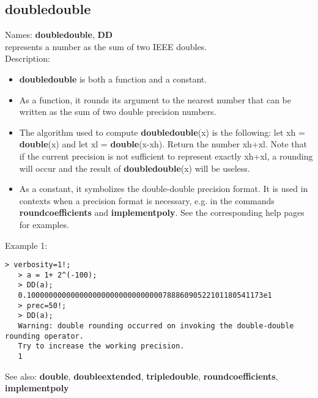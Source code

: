 \subsection{ doubledouble }
\noindent Names: \textbf{doubledouble}, \textbf{DD}\\
represents a number as the sum of two IEEE doubles.\\

\noindent Description: \begin{itemize}

\item \textbf{doubledouble} is both a function and a constant.

\item As a function, it rounds its argument to the nearest number that can be written
   as the sum of two double precision numbers.

\item The algorithm used to compute \textbf{doubledouble}(x) is the following: let xh = \textbf{double}(x)
   and let xl = \textbf{double}(x-xh). Return the number xh+xl. Note that if the current 
   precision is not sufficient to represent exactly xh+xl, a rounding will occur
   and the result of \textbf{doubledouble}(x) will be useless.

\item As a constant, it symbolizes the double-double precision format. It is used in 
   contexts when a precision format is necessary, e.g. in the commands 
   \textbf{roundcoefficients} and \textbf{implementpoly}.
   See the corresponding help pages for examples.
\end{itemize}
\noindent Example 1: 
\begin{center}\begin{minipage}{14.8cm}\begin{Verbatim}[frame=single]
   > verbosity=1!;
   > a = 1+ 2^(-100);
   > DD(a);
   0.100000000000000000000000000000078886090522101180541173e1
   > prec=50!;
   > DD(a);
   Warning: double rounding occurred on invoking the double-double rounding operator.
   Try to increase the working precision.
   1
\end{Verbatim}
\end{minipage}\end{center}
See also: \textbf{double}, \textbf{doubleextended}, \textbf{tripledouble}, \textbf{roundcoefficients}, \textbf{implementpoly}
